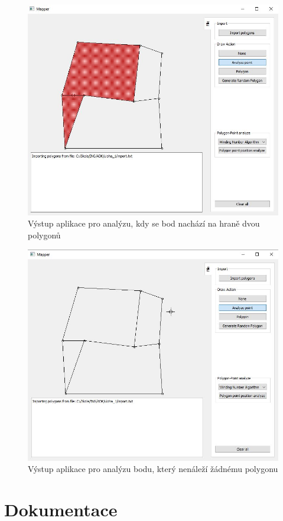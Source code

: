 \documentclass[a4paper, 12pt]{article}
\begin{document}
\begin{figure}[h!]
	\centering
	\includegraphics[width=12cm]{vystup3.jpg}
	\caption{Výstup aplikace pro analýzu, kdy se bod nachází na hraně dvou polygonů}
\end{figure}

\begin{figure}[h!]
	\centering
	\includegraphics[width=12cm]{vystup4.jpg}
	\caption{Výstup aplikace pro analýzu bodu, který nenáleží žádnému polygonu}
\end{figure}

\clearpage
\section{Dokumentace}
\end{document}
